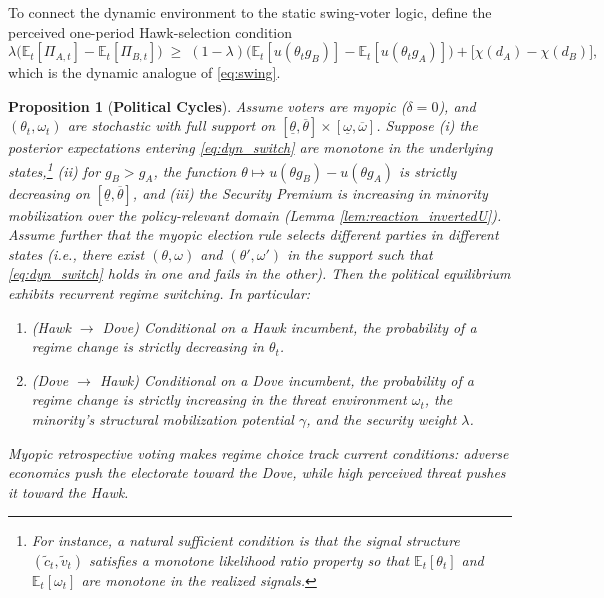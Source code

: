 \documentclass[11pt,twoside]{extarticle}
\newtheorem{proposition}{Proposition}
\begin{document}
To connect the dynamic environment to the static swing-voter logic, define the perceived one-period Hawk-selection condition
\begin{equation} \label{eq:dyn_switch}
\lambda\Big(\mathbb{E}_t[\Pi_{A,t}]-\mathbb{E}_t[\Pi_{B,t}]\Big)\;\ge\;(1-\lambda)\Big(\mathbb{E}_t[u(\theta_t g_B)]-\mathbb{E}_t[u(\theta_t g_A)]\Big)+\big[\chi(d_A)-\chi(d_B)\big],
\end{equation}
which is the dynamic analogue of \autoref{eq:swing}.

\begin{proposition}[\textbf{Political Cycles}] \label{prop:cycles}
Assume voters are myopic ($\delta=0$), and $(\theta_t,\omega_t)$ are stochastic with full support on $[\underline{\theta},\overline{\theta}]\times[\underline{\omega},\overline{\omega}]$. Suppose (i) the posterior expectations entering \autoref{eq:dyn_switch} are monotone in the underlying states,\footnote{For instance, a natural sufficient condition is that the signal structure $(\tilde{c}_t,\tilde{v}_t)$ satisfies a monotone likelihood ratio property so that $\mathbb{E}_t[\theta_t]$ and $\mathbb{E}_t[\omega_t]$ are monotone in the realized signals.} (ii) for $g_B>g_A$, the function $\theta \mapsto u(\theta g_B)-u(\theta g_A)$ is strictly decreasing on $[\underline{\theta},\overline{\theta}]$, and (iii) the Security Premium is increasing in minority mobilization over the policy-relevant domain (Lemma \autoref{lem:reaction_invertedU}). Assume further that the myopic election rule selects different parties in different states (i.e., there exist $(\theta,\omega)$ and $(\theta',\omega')$ in the support such that \autoref{eq:dyn_switch} holds in one and fails in the other). Then the political equilibrium exhibits recurrent regime switching. In particular:
\begin{enumerate}[label=(\roman*)]
    \item (\emph{Hawk $\rightarrow$ Dove}) Conditional on a Hawk incumbent, the probability of a regime change is strictly decreasing in $\theta_t$.
    \item (\emph{Dove $\rightarrow$ Hawk}) Conditional on a Dove incumbent, the probability of a regime change is strictly increasing in the threat environment $\omega_t$, the minority's structural mobilization potential $\gamma$, and the security weight $\lambda$.
\end{enumerate}
Myopic retrospective voting makes regime choice track current conditions: adverse economics push the electorate toward the Dove, while high perceived threat pushes it toward the Hawk.
\end{proposition}
\end{document}

